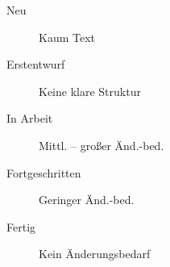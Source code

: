 \begin{description}
	\item[ Neu]  				Kaum Text
	\item[ Erstentwurf]  Keine klare Struktur
	\item[ In Arbeit]		Mittl. -- großer Änd.-bed.
	\item[ Fortgeschritten]	Geringer Änd.-bed.
	\item[ Fertig] 	Kein Änderungsbedarf
\end{description}
